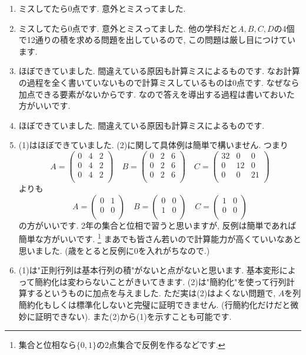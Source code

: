 \documentclass[uplatex,dvipdfmx,a4paper,14pt]{jsarticle}
\begin{document}
  \begin{enumerate}[label={\textbf{第}\arabic*\textbf{問}.}]
\item ミスしてたら0点です. 意外とミスってました. 
\item ミスしてたら0点です. 意外とミスってました. 他の学科だと$A,B,C,D$の4個で12通りの積を求める問題を出しているので, この問題は厳し目につけています. 
\item ほぼできていました. 間違えている原因も計算ミスによるものです. なお計算の過程を全く書いていないもので計算ミスしているものは0点です. なぜなら加点できる要素がないからです. なので答えを導出する過程は書いておいた方がいいです. 
\item ほぼできていました. 間違えている原因も計算ミスによるものです.  
\item (1)はほぼできていました. (2)に関して具体例は簡単で構いません. 
つまり
$$
A=\begin{pmatrix}
0&4&2\\
0&4&2\\
0&4&2\\
\end{pmatrix}
\quad
B=\begin{pmatrix}
0&2&6\\
0&2&6\\
0&2&6\\
\end{pmatrix}
\quad
C=\begin{pmatrix}
32&0&0\\
0&12&0\\
0&0&21\\
\end{pmatrix}
$$
よりも
$$
A=\begin{pmatrix}
0&1\\
0&0\\
\end{pmatrix}
\quad
B=\begin{pmatrix}
0&0\\
1&0\\
\end{pmatrix}
\quad
C=\begin{pmatrix}
1&0\\
0&0\\
\end{pmatrix}
$$
の方がいいです. 2年の集合と位相で習うと思いますが, 反例は簡単であれば簡単な方がいいです. \footnote{集合と位相なら$\{ 0,1\}$の2点集合で反例を作るなどです. }
まあでも皆さん若いので計算能力が高くていいなあと思いました. (歳をとると反例に0を入れがちなので.)
\item (1)は"正則行列は基本行列の積"がないと点がないと思います. 基本変形によって簡約化は変わらないことがきいてきます. (2)は"簡約化"を使って行列計算するというものに加点を与えました. ただ実は(2)はよくない問題で, $A$を列簡約化もしくは標準化しないと完璧に証明できません. (行簡約化だけだと微妙に証明できない). 
また(2)から(1)を示すことも可能です. 


\end{enumerate}
\end{document}
